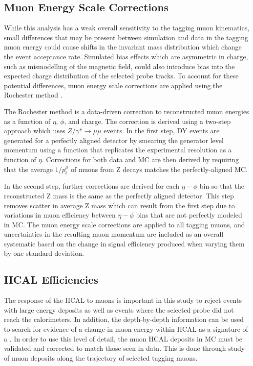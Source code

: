 \subsection{Muon Energy Scale Corrections}
While this analysis has a weak overall sensitivity to the tagging muon kinematics, small differences that may be present between simulation and data in the tagging muon energy could cause shifts in the invariant mass distribution which change the event acceptance rate.
Simulated bias effects which are asymmetric in charge, such as mismodelling of the magnetic field, could also introduce bias into the expected charge distribution of the selected probe tracks.
To account for these potential differences, muon energy scale corrections are applied using the Rochester method \cite{rochester_corr}.

The Rochester method is a data-driven correction to reconstructed muon energies as a function of $\eta$, $\phi$, and charge.
The correction is derived using a two-step approach which uses $Z/\gamma* \rightarrow \mu\mu$ events.
In the first step, DY events are generated for a perfectly aligned detector by smearing the generator level momentum using a function that replicates the experimental resolution as a function of $\eta$. 
Corrections for both data and MC are then derived by requiring that the average $1/p_t^\mu$ of muons from Z decays matches the perfectly-aligned MC.

In the second step, further corrections are derived for each $\eta-\phi$ bin so that the reconstructed Z mass is the same as the perfectly aligned detector. 
This step removes scatter in average Z mass which can result from the first step due to variations in muon efficiency between $\eta-\phi$ bins that are not perfectly modeled in MC. 
The muon energy scale corrections are applied to all tagging muons, and uncertainties in the resulting muon momentum are included as an overall systematic based on the change in signal efficiency produced when varying them by one standard deviation.

\subsection{HCAL Efficiencies}
\label{sec:HCALeff}
The response of the HCAL to muons is important in this study to reject events with large energy deposits as well as events where the selected probe did not reach the calorimeters.
In addition, the depth-by-depth information can be used to search for evidence of a change in muon energy within HCAL as a signature of a \dbrem.
In order to use this level of detail, the muon HCAL deposits in MC must be validated and corrected to match those seen in data.
This is done through study of muon deposits along the trajectory of selected tagging muons.

